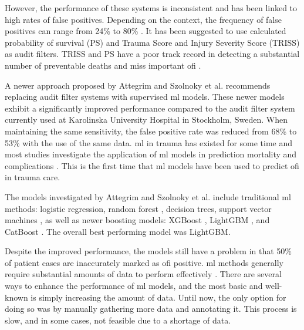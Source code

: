 \documentclass[12pt, a4paper]{article}
\begin{document}
However, the performance of these systems is inconsistent and has been linked to high rates of false positives. Depending on the context, the frequency of false positives can range from 24\% to 80\% \cite{attergrim_predicting_2023,sanddal_analysis_2011,roy_learning_2017,ghorbani_analysis_2018}. It has been suggested to use calculated probability of survival (PS) and Trauma Score and Injury Severity Score (TRISS) as audit filters. TRISS and PS have a poor track record in detecting a substantial number of preventable deaths and miss important \acrshort{ofi} \cite{heim_survival_2016}.

A newer approach proposed by Attegrim and Szolnoky et al. \cite{attergrim_predicting_2023} recommends replacing audit filter systems with supervised \acrfull{ml} models. These newer models exhibit a significantly improved performance compared to the audit filter system currently used at Karolinska University Hospital in Stockholm, Sweden. When maintaining the same sensitivity, the false positive rate was reduced from 68\% to 53\% with the use of the same data. \acrshort{ml} in trauma has existed for some time and most studies investigate the application of \acrshort{ml} models in prediction mortality and complications \cite{zhang_machine_2022}. This is the first time that \acrshort{ml} models have been used to predict \acrshort{ofi} in trauma care.

The models investigated by Attegrim and Szolnoky et al. include traditional \acrshort{ml} methods: logistic regression, random forest \cite{breiman_random_2001}, decision trees, support vector machines \cite{cortes_support-vector_1995}, as well as newer boosting models: XGBoost \cite{chen_xgboost_2016}, LightGBM \cite{ke_lightgbm_2017}, and CatBoost \cite{prokhorenkova_catboost_2018}. The overall best performing model was LightGBM.

Despite the improved performance, the models still have a problem in that 50\% of patient cases are inaccurately marked as \acrshort{ofi} positive. \acrshort{ml} methods generally require substantial amounts of data to perform effectively \cite{piccialli_survey_2021}. There are several ways to enhance the performance of \acrshort{ml} models, and the most basic and well-known is simply increasing the amount of data. Until now, the only option for doing so was by manually gathering more data and annotating it. This process is slow, and in some cases, not feasible due to a shortage of data.

\end{document}
